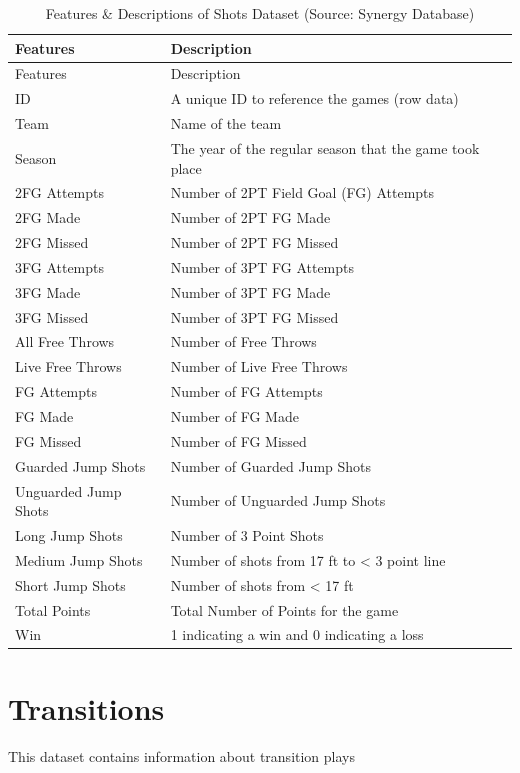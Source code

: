\documentclass[]{book}
\begin{document}
\begin{longtable}[]{@{}ll@{}}
\caption{\label{tab:shots} Features \& Descriptions of Shots Dataset (Source: Synergy Database)}\tabularnewline
\toprule
Features & Description\tabularnewline
\midrule
\endfirsthead
\toprule
Features & Description\tabularnewline
\midrule
\endhead
ID & A unique ID to reference the games (row data)\tabularnewline
Team & Name of the team\tabularnewline
Season & The year of the regular season that the game took place\tabularnewline
2FG Attempts & Number of 2PT Field Goal (FG) Attempts\tabularnewline
2FG Made & Number of 2PT FG Made\tabularnewline
2FG Missed & Number of 2PT FG Missed\tabularnewline
3FG Attempts & Number of 3PT FG Attempts\tabularnewline
3FG Made & Number of 3PT FG Made\tabularnewline
3FG Missed & Number of 3PT FG Missed\tabularnewline
All Free Throws & Number of Free Throws\tabularnewline
Live Free Throws & Number of Live Free Throws\tabularnewline
FG Attempts & Number of FG Attempts\tabularnewline
FG Made & Number of FG Made\tabularnewline
FG Missed & Number of FG Missed\tabularnewline
Guarded Jump Shots & Number of Guarded Jump Shots\tabularnewline
Unguarded Jump Shots & Number of Unguarded Jump Shots\tabularnewline
Long Jump Shots & Number of 3 Point Shots\tabularnewline
Medium Jump Shots & Number of shots from 17 ft to \textless{} 3 point line\tabularnewline
Short Jump Shots & Number of shots from \textless{} 17 ft\tabularnewline
Total Points & Total Number of Points for the game\tabularnewline
Win & 1 indicating a win and 0 indicating a loss\tabularnewline
\bottomrule
\end{longtable}

\hypertarget{transitions}{%
\section{Transitions}\label{transitions}}

This dataset contains information about transition plays
\end{document}
